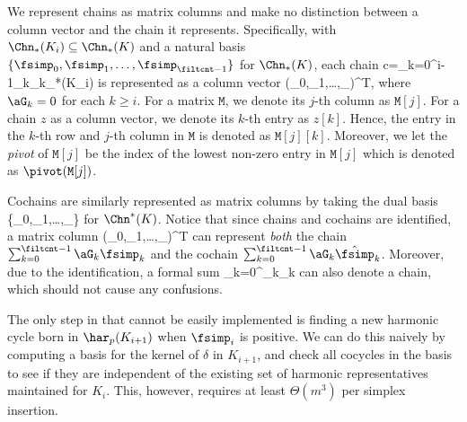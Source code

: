 We represent
chains   as matrix columns
and make no distinction between a  column vector
and the chain it represents.
Specifically, 
with $\Chn_*(K_i)\subseteq\Chn_*(K)$
and a natural basis $\{\fsimp_0,\fsimp_1,\ldots,\fsimp_{\filtcnt-1}\}$
for $\Chn_*(K)$,
each chain \mbeg c=\sum_{k=0}^{i-1}\aG_k\fsimp_k\in\Chn_*(K_i)\mend
is represented as a column vector  \mbeg(\aG_0,\aG_1,\ldots,\aG_{})^T,\mend
where $\aG_k=0$ for each $k\geq i$.
For a matrix $\mathtt{M}$, we denote its $j$-th
column as $\mathtt{M}[j]$.
For a chain $z$ as a column vector,
we  denote its $k$-th entry as $z[k]$.
Hence, the entry in the $k$-th row and $j$-th column 
in $\mathtt{M}$ is denoted as $\mathtt{M}[j][k]$.
Moreover,
we let the \emph{pivot} of $\mathtt{M}[j]$
be the index of the lowest non-zero entry in 
$\mathtt{M}[j]$
which is denoted as $\pivot(\mathtt{M}[j])$.

Cochains are similarly represented as matrix columns
by taking the dual basis \mbeg\{\hat{\fsimp}_0,\hat{\fsimp}_1,\ldots,\hat{\fsimp}_{}\}\mend
for $\Chn^*(K)$.
Notice that since chains and cochains
are  identified, 
a matrix column \mbeg(\aG_0,\aG_1,\ldots,\aG_{})^T\mend
can represent \emph{both} the chain $\sum_{k=0}^{\filtcnt-1}\aG_k\fsimp_k$ and the cochain
$\sum_{k=0}^{\filtcnt-1}\aG_k\hat{\fsimp}_k$.
Moreover, due to the identification,
 a formal sum \mbeg\sum_{k=0}^{}\aG_k\hat{\fsimp}_k\mend
can also denote a chain,
which should not cause any confusions.


The only step in 
that cannot be easily implemented
is finding a new harmonic cycle born in $\har_p(K_{i+1})$
when 
$\fsimp_i$ 
is positive.
We can do this naively by computing a basis for the  kernel of $\delta$ in $K_{i+1}$, and check all   cocycles in the basis to see if they are independent of the existing set of harmonic representatives
maintained for $K_i$. This, however, requires at least $\Theta(m^3)$ per simplex insertion.


